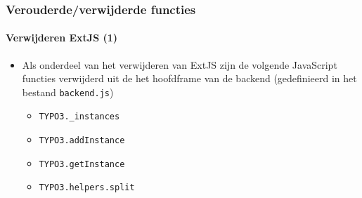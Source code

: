 \begin{frame}[fragile]
	\frametitle{Verouderde/verwijderde functies}
	\framesubtitle{Verwijderen ExtJS (1)}

	\begin{itemize}
		\item Als onderdeel van het verwijderen van ExtJS zijn de volgende JavaScript functies verwijderd
		 	uit de het hoofdframe van de backend (gedefinieerd in het bestand \texttt{backend.js})

		\begin{itemize}
			\item \texttt{TYPO3.\_instances}
			\item \texttt{TYPO3.addInstance}
			\item \texttt{TYPO3.getInstance}
			\item \texttt{TYPO3.helpers.split}
		\end{itemize}

	\end{itemize}

\end{frame}
